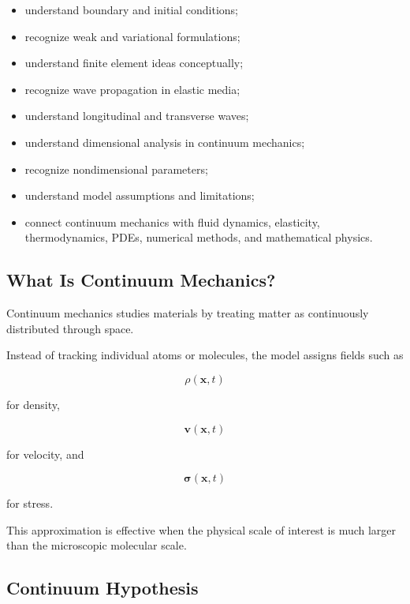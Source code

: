 {\begin{itemize}
    \item understand boundary and initial conditions;
    \item recognize weak and variational formulations;
    \item understand finite element ideas conceptually;
    \item recognize wave propagation in elastic media;
    \item understand longitudinal and transverse waves;
    \item understand dimensional analysis in continuum mechanics;
    \item recognize nondimensional parameters;
    \item understand model assumptions and limitations;
    \item connect continuum mechanics with fluid dynamics, elasticity,
          thermodynamics, PDEs, numerical methods, and mathematical physics.
\end{itemize}
}

\subsection{What Is Continuum Mechanics?}
\label{subsec:what-is-continuum-mechanics}

Continuum mechanics studies materials by treating matter as continuously
distributed through space.

Instead of tracking individual atoms or molecules, the model assigns fields
such as

\[
\boxed{
\rho(\mathbf{x},t)
}
\]

for density,

\[
\boxed{
\mathbf{v}(\mathbf{x},t)
}
\]

for velocity, and

\[
\boxed{
\boldsymbol{\sigma}(\mathbf{x},t)
}
\]

for stress.

This approximation is effective when the physical scale of interest is much
larger than the microscopic molecular scale.

\subsection{Continuum Hypothesis}
\label{subsec:continuum-hypothesis}

